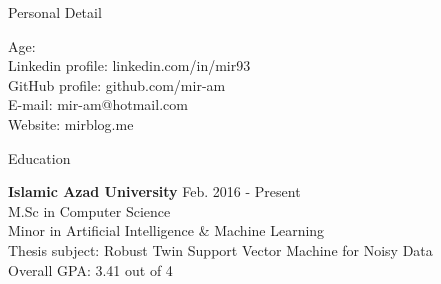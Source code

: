\documentclass{resume} %
\begin{document}
\begin{rSection}{Personal Detail}

\begin{multicols}{2}
Age: \FPtrunc{}\myage\\
Linkedin profile: linkedin.com/in/mir93 \\
GitHub profile: github.com/mir-am \\
\columnbreak
E-mail: mir-am@hotmail.com \\
Website: mirblog.me\\

\end{multicols}

	
	

	



	
\end{rSection}


\begin{rSection}{Education}

{\bf Islamic Azad University} \hfill {Feb. 2016 - Present} \\ 
M.Sc in Computer Science  \\
Minor in Artificial Intelligence \& Machine Learning  \smallskip \\
Thesis subject: Robust Twin Support Vector Machine for Noisy Data \\
Overall GPA: 3.41 out of 4

\end{rSection}

\end{document}
